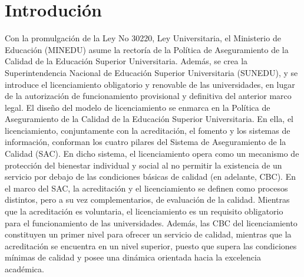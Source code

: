 \section{Introdución} 
\vspace{12mm} %


Con la promulgación de la Ley No 30220, Ley Universitaria, el Ministerio de Educación (MINEDU) asume la rectoría de la Política de Aseguramiento de la Calidad de la Educación Superior Universitaria. Además, se crea la Superintendencia Nacional de Educación Superior Universitaria (SUNEDU), y se introduce el licenciamiento obligatorio y renovable de las universidades, en lugar de la autorización de funcionamiento provisional y definitiva del anterior marco legal.
El diseño del modelo de licenciamiento se enmarca en la Política de Aseguramiento de la Calidad de la
Educación Superior Universitaria. En ella, el licenciamiento, conjuntamente con la acreditación, el fomento y los sistemas de información, conforman los cuatro pilares del Sistema de Aseguramiento de la Calidad (SAC). En dicho sistema, el licenciamiento opera como un mecanismo de protección del bienestar individual y social al no permitir la existencia de un servicio por debajo de las condiciones básicas de calidad (en adelante, CBC).
En el marco del SAC, la acreditación y el licenciamiento se definen como procesos distintos, pero a su vez complementarios, de evaluación de la calidad. Mientras que la acreditación es voluntaria, el licenciamiento es un requisito obligatorio para el funcionamiento de las universidades. Además, las CBC del licenciamiento constituyen un primer nivel para ofrecer un servicio de calidad, mientras que la acreditación se encuentra en un nivel superior, puesto que supera las condiciones mínimas de calidad y posee una dinámica orientada hacia la excelencia académica.


		

